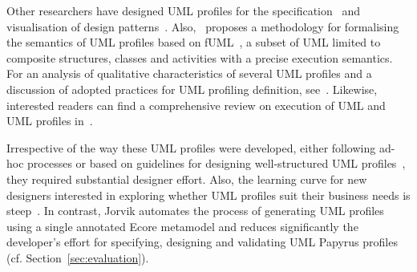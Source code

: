 Other researchers have designed UML profiles for the 
specification~\cite{Debnath2006:ICCSA,Mak2004:ICSE} and visualisation of 
design patterns~\cite{Dong2007:TSE}. 
Also,~\cite{tatibouet2014formalizing} proposes a methodology for formalising the semantics of UML profiles based on fUML~\cite{fuml}, a subset of UML
limited to composite structures, classes and activities with a precise execution semantics. 
For an analysis of qualitative characteristics of several UML profiles and a discussion of adopted practices for UML profiling definition, see~\cite{Pardillo2010:MODELS}.
Likewise, interested readers can find a comprehensive review on execution of UML and UML profiles in~\cite{ciccozzi2018execution}.

Irrespective of the way these UML profiles were developed, either 
following ad-hoc processes or based on guidelines for designing well-structured 
UML profiles~\cite{FuentesFernandez2004:UMLME,Selic2007:ISORC},
they required substantial designer effort. Also, the learning 
curve for new designers interested in exploring whether UML profiles suit their 
business needs is steep~\cite{Giachetti2009:CAISE}.
In contrast, Jorvik automates the process of generating UML profiles using a single annotated Ecore metamodel and reduces significantly the developer's effort for specifying, designing and validating UML Papyrus profiles (cf. Section~\ref{sec:evaluation}).


